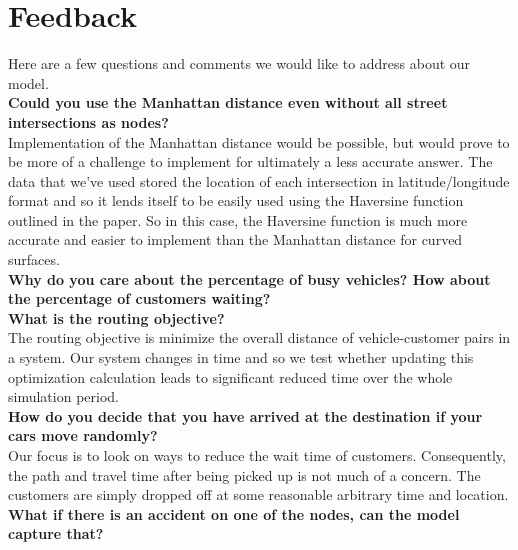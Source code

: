 \documentclass[Proceedings]{ascelike}
\begin{document}
%
\pagebreak
%
%
%
\appendix\label{section:feedback}

\section*{Feedback}

Here are a few questions and comments we would like to address about our model.\\

\textbf{Could you use the Manhattan distance even without all street intersections as nodes?} \\

Implementation of the Manhattan distance would be possible, but would prove to be more of a challenge to implement for ultimately a less accurate answer. The data that we've used stored the location of each intersection in latitude/longitude format and so it lends itself to be easily used using the Haversine function outlined in the paper. So in this case, the Haversine function is much more accurate and easier to implement than the Manhattan distance for curved surfaces. \\    

\textbf{Why do you care about the percentage of busy vehicles? How about the percentage of customers waiting?}\\

\textbf{What is the routing objective?} \\

The routing objective is minimize the overall distance of vehicle-customer pairs in a system. Our system changes in time and so we test whether updating this optimization calculation leads to significant reduced time over the whole simulation period.\\

\textbf{How do you decide that you have arrived at the destination if your cars move randomly?}\\

Our focus is to look on ways to reduce the wait time of customers. Consequently, the path and travel time after being picked up is not much of a concern. The customers are simply dropped off at some reasonable arbitrary time and location. \\


\textbf{What if there is an accident on one of the nodes, can the model capture that?}\\
\end{document}
